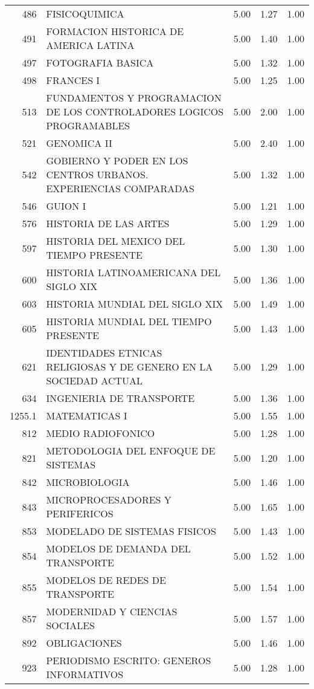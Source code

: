 \documentclass[12pt]{article}
\begin{document}
\begin{table}[ht]
\begin{tabular}{rlrrr}
  486 & FISICOQUIMICA & 5.00 & 1.27 & 1.00 \\ 
  491 & FORMACION HISTORICA DE AMERICA LATINA & 5.00 & 1.40 & 1.00 \\ 
  497 & FOTOGRAFIA BASICA & 5.00 & 1.32 & 1.00 \\ 
  498 & FRANCES I & 5.00 & 1.25 & 1.00 \\ 
  513 & FUNDAMENTOS Y PROGRAMACION DE LOS CONTROLADORES LOGICOS PROGRAMABLES & 5.00 & 2.00 & 1.00 \\ 
  521 & GENOMICA II & 5.00 & 2.40 & 1.00 \\ 
  542 & GOBIERNO Y PODER EN LOS CENTROS URBANOS. EXPERIENCIAS COMPARADAS & 5.00 & 1.32 & 1.00 \\ 
  546 & GUION I & 5.00 & 1.21 & 1.00 \\ 
  576 & HISTORIA DE LAS ARTES & 5.00 & 1.29 & 1.00 \\ 
  597 & HISTORIA DEL MEXICO DEL TIEMPO PRESENTE & 5.00 & 1.30 & 1.00 \\ 
  600 & HISTORIA LATINOAMERICANA DEL SIGLO XIX & 5.00 & 1.36 & 1.00 \\ 
  603 & HISTORIA MUNDIAL DEL SIGLO XIX & 5.00 & 1.49 & 1.00 \\ 
  605 & HISTORIA MUNDIAL DEL TIEMPO PRESENTE & 5.00 & 1.43 & 1.00 \\ 
  621 & IDENTIDADES ETNICAS RELIGIOSAS Y DE GENERO EN LA SOCIEDAD ACTUAL & 5.00 & 1.29 & 1.00 \\ 
  634 & INGENIERIA DE TRANSPORTE & 5.00 & 1.36 & 1.00 \\ 
  1255.1 & MATEMATICAS I & 5.00 & 1.55 & 1.00 \\ 
  812 & MEDIO RADIOFONICO & 5.00 & 1.28 & 1.00 \\ 
  821 & METODOLOGIA DEL ENFOQUE DE SISTEMAS & 5.00 & 1.20 & 1.00 \\ 
  842 & MICROBIOLOGIA & 5.00 & 1.46 & 1.00 \\ 
  843 & MICROPROCESADORES Y PERIFERICOS & 5.00 & 1.65 & 1.00 \\ 
  853 & MODELADO DE SISTEMAS FISICOS & 5.00 & 1.43 & 1.00 \\ 
  854 & MODELOS DE DEMANDA DEL TRANSPORTE & 5.00 & 1.52 & 1.00 \\ 
  855 & MODELOS DE REDES DE TRANSPORTE & 5.00 & 1.54 & 1.00 \\ 
  857 & MODERNIDAD Y CIENCIAS SOCIALES & 5.00 & 1.57 & 1.00 \\ 
  892 & OBLIGACIONES & 5.00 & 1.46 & 1.00 \\ 
  923 & PERIODISMO ESCRITO: GENEROS INFORMATIVOS & 5.00 & 1.28 & 1.00 \\ 

\end{tabular}
\end{table}
\end{document}
